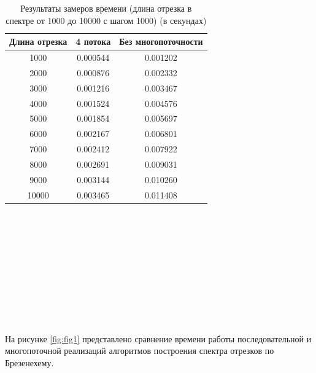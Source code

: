 \begin{table}[h]
    \begin{center}
        \caption{Результаты замеров времени (длина отрезка в спектре от 1000 до 10000 с шагом 1000) (в секундах)}
        \label{tbl:time_mes_difdiam}
        \begin{tabular}{|c|c|c|}
            \hline
            Длина отрезка & 4 потока & Без многопоточности \\
            \hline
            1000 & 0.000544 & 0.001202 \\ \hline  
            2000 & 0.000876 & 0.002332 \\ \hline
            3000 & 0.001216 & 0.003467 \\ \hline
            4000 & 0.001524 & 0.004576 \\ \hline 
            5000 & 0.001854 & 0.005697 \\ \hline 
            6000 & 0.002167 & 0.006801 \\ \hline 
            7000 & 0.002412 & 0.007922 \\ \hline 
            8000 & 0.002691 & 0.009031 \\ \hline 
            9000 & 0.003144 & 0.010260 \\ \hline
            10000 & 0.003465 & 0.011408 \\ \hline  
		\end{tabular}
\end{center}
\end{table}
\\
\\
\\
\\
\\
\\
\\
\\
\\
\\

\FloatBarrier
На рисунке \ref{fig:fig1} представлено сравнение времени работы последовательной и многопоточной реализаций алгоритмов построения спектра отрезков по Брезенехему.
\\
\\
\\
\\

